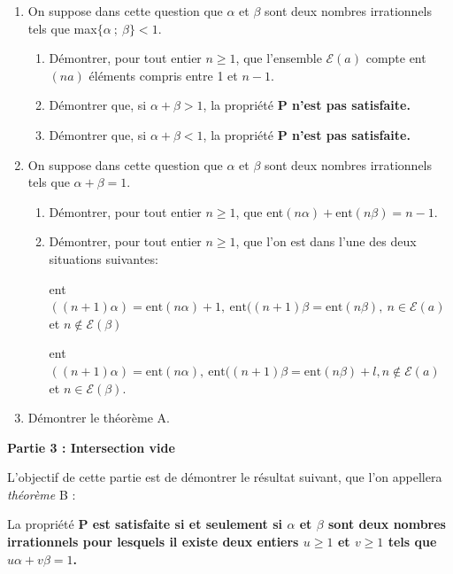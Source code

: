 \documentclass[landscape,twocolumn,leqno,a4paper,10pt]{report} %
\renewcommand{\textbf}[1]{\begingroup\bfseries\mathversion{bold}#1\endgroup}		%
\begin{document}
\begin{enumerate}[resume]
\item On suppose dans cette question que $\alpha$ et $\beta$ sont deux nombres irrationnels tels que max$\{\alpha~;~\beta\} < 1$. 
	\begin{enumerate}
		\item Démontrer, pour tout entier $n \geqslant 1$, que l'ensemble $\mathcal{E}(a)$ compte ent$(na)$ éléments compris entre 1 et $n - 1$.
		\item Démontrer que, si $\alpha + \beta > 1$, la propriété \textbf{P}{\small $\cap$} n'est pas satisfaite.
		\item Démontrer que, si $\alpha + \beta < 1$, la propriété \textbf{P}{\small $\cup$} n'est pas satisfaite.
	\end{enumerate}
\item On suppose dans cette question que $\alpha$ et $\beta$ sont deux nombres irrationnels tels que $\alpha + \beta = 1$.
	\begin{enumerate}
		\item Démontrer, pour tout entier $n \geqslant 1$, que ent$(n\alpha) + \text{ent}(n\beta) = n - 1$.
		\item Démontrer, pour tout entier $n \geqslant 1$, que l'on est dans l'une des deux situations suivantes:
		
 ent$((n + 1)\alpha) = \text{ent}(n\alpha) + 1,\: \text{ent}((n + 1)\beta = \text{ent}(n\beta), \:n \in \mathcal{E}(a)$ et $n \notin \mathcal{E}(\beta)$  

 ent$((n + 1)\alpha) = \text{ent}(n\alpha),\: \text{ent}((n + 1)\beta= \text{ent}(n\beta) + l, n \notin  \mathcal{E}(a)$ et $n \in   \mathcal{E}(\beta)$.
	\end{enumerate}
\item Démontrer le théorème A.
\end{enumerate}

\bigskip

\begin{center}
\textbf{Partie 3 : Intersection vide}\end{center}

L'objectif de cette partie est de démontrer le résultat suivant, que l'on appellera \emph{théorème} B :

La propriété \textbf{P}{\small $\cap$} est satisfaite si et seulement si $\alpha$ et $\beta$ sont deux nombres irrationnels pour lesquels il existe deux entiers $u \geqslant 1$ et $v \geqslant 1$ tels que $u\alpha  + v\beta = 1$.
\end{document}
